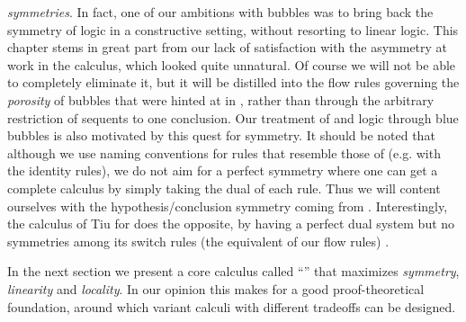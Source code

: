 \begin{description}
    \emph{symmetries}. In fact, one of our ambitions with bubbles was to bring
    back the symmetry of  logic in a constructive setting, without
    resorting to linear logic. This chapter stems in great part from our lack of
    satisfaction with the asymmetry at work in the  calculus, which
    looked quite unnatural. Of course we will not be able to completely
    eliminate it, but it will be distilled into the flow rules governing the
    \emph{porosity} of bubbles that were hinted at in , rather
    than through the arbitrary restriction of sequents to one
    conclusion. Our treatment of
     and  logic through blue bubbles is
    also motivated by this quest for symmetry. It should be noted that although
    we use naming conventions for rules that resemble those of  (e.g.
    with the identity rules), we do not aim for a perfect symmetry where one can
    get a complete calculus by simply taking the dual of each rule.
    Thus we will content ourselves with the hypothesis/conclusion symmetry
    coming from . Interestingly, the calculus  of Tiu
    for   does the opposite, by having a perfect
    dual system  but no symmetries among its switch rules (the
    equivalent of our flow rules) \cite{tiu_local_2006}.
\end{description}

In the next section we present a core calculus called ``'' that
maximizes \emph{symmetry}, \emph{linearity} and \emph{locality}. In our opinion
this makes for a good proof-theoretical foundation, around which variant calculi
with different tradeoffs can be designed.


